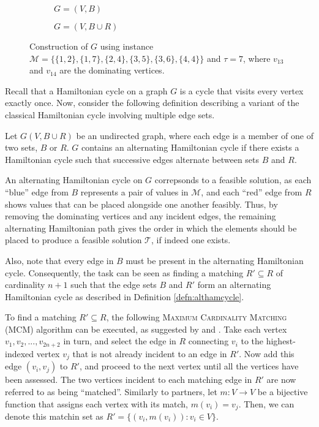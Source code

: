 \documentclass[oribibl]{llncs}
\begin{document}
\begin{figure}	
\centering
\begin{subfigure}[h]{0.45\textwidth}
	
	\caption{$G = (V, B)$}	
	\label{fig:partners}
\end{subfigure} \hspace{40pt}
\begin{subfigure}[h]{0.45\textwidth}
	
	\caption{$G=(V, B \cup R)$}	
	\label{fig:threshold}
\end{subfigure}
\caption{Construction of $G$ using instance $\mathcal{M} = \{\{1,2\}, \{1,7\}, \{2,4\}, \{3,5\}, \{3,6\}, \{4,4\}\}$ and $\tau = 7$, where $v_{13}$ and $v_{14}$ are the dominating vertices.}
\label{fig:partners/threshold}
\end{figure}

Recall that a Hamiltonian cycle on a graph $G$ is a cycle that visits every vertex exactly once. Now, consider the following definition describing a variant of the classical Hamiltonian cycle involving multiple edge sets.
\begin{definition}
	\label{defn:althamcycle}
	Let $G(V, B\cup R)$ be an undirected graph, where each edge is a member of one of two sets, $B$ or $R$. $G$ contains an alternating Hamiltonian cycle if there exists a Hamiltonian cycle such that successive edges alternate between sets $B$ and $R$.
\end{definition}

An alternating Hamiltonian cycle on $G$ correpsonds to a feasible solution, as each ``blue'' edge from $B$ represents a pair of values in $\mathcal{M}$, and each ``red'' edge from $R$ shows values that can be placed alongside one another feasibly. Thus, by removing the dominating vertices and any incident edges, the remaining alternating Hamiltonian path gives the order in which the elements should be placed to produce a feasible solution $\mathcal{T}$, if indeed one exists.

Also, note that every edge in $B$ must be present in the alternating Hamiltonian cycle. Consequently, the task can be seen as finding a matching $R' \subseteq R$ of cardinality $n+1$ such that the edge sets $B$ and $R'$ form an alternating Hamiltonian cycle as described in Definition \ref{defn:althamcycle}. 

To find a matching $R' \subseteq R$, the following \textsc{Maximum Cardinality Matching} (MCM) algorithm can be executed, as suggested by \cite{mahadev1994} and \cite{becker2010}. Take each vertex $v_1, v_2,..., v_{2n+2}$ in turn, and select the edge in $R$ connecting $v_i$ to the highest-indexed vertex $v_j$ that is not already incident to an edge in $R'$. Now add this edge $(v_i, v_j)$ to $R'$, and proceed to the next vertex until all the vertices have been assessed. The two vertices incident to each matching edge in $R'$ are now referred to as being ``matched''. Similarly to partners, let $m : V \to V$ be a bijective function that assigns each vertex with its match, $m(v_i) = v_j$. Then, we can denote this matchin set as $R' =\{(v_i, m(v_i)) : v_i \in V\}$. 
\end{document}
